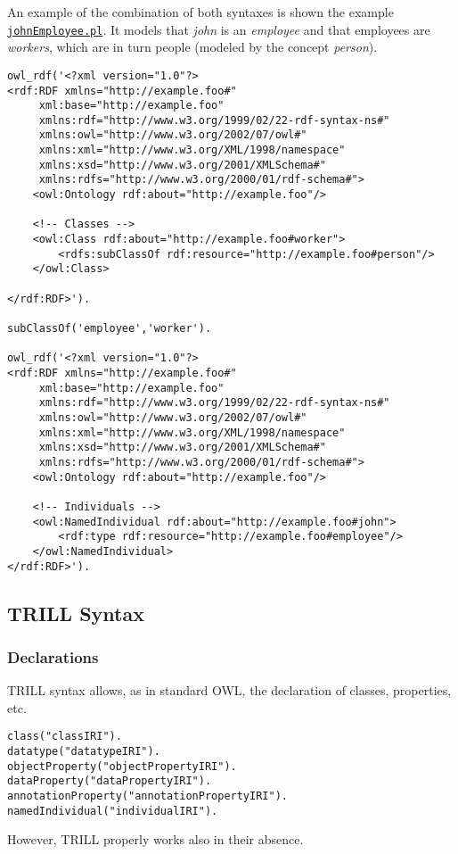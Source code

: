 An example of the combination of both syntaxes is shown the example \href{http://trill.lamping.unife.it/example/trill/johnEmployee.pl}{\texttt{johnEmployee.pl}}. It models that \textit{john} is an \textit{employee} and that employees are \textit{workers}, which are in turn people (modeled by the concept \textit{person}).
\begin{verbatim}
owl_rdf('<?xml version="1.0"?>
<rdf:RDF xmlns="http://example.foo#"
     xml:base="http://example.foo"
     xmlns:rdf="http://www.w3.org/1999/02/22-rdf-syntax-ns#"
     xmlns:owl="http://www.w3.org/2002/07/owl#"
     xmlns:xml="http://www.w3.org/XML/1998/namespace"
     xmlns:xsd="http://www.w3.org/2001/XMLSchema#"
     xmlns:rdfs="http://www.w3.org/2000/01/rdf-schema#">
    <owl:Ontology rdf:about="http://example.foo"/>

    <!-- Classes -->
    <owl:Class rdf:about="http://example.foo#worker">
        <rdfs:subClassOf rdf:resource="http://example.foo#person"/>
    </owl:Class>

</rdf:RDF>').

subClassOf('employee','worker').

owl_rdf('<?xml version="1.0"?>
<rdf:RDF xmlns="http://example.foo#"
     xml:base="http://example.foo"
     xmlns:rdf="http://www.w3.org/1999/02/22-rdf-syntax-ns#"
     xmlns:owl="http://www.w3.org/2002/07/owl#"
     xmlns:xml="http://www.w3.org/XML/1998/namespace"
     xmlns:xsd="http://www.w3.org/2001/XMLSchema#"
     xmlns:rdfs="http://www.w3.org/2000/01/rdf-schema#">
    <owl:Ontology rdf:about="http://example.foo"/>
    
    <!-- Individuals -->
    <owl:NamedIndividual rdf:about="http://example.foo#john">
        <rdf:type rdf:resource="http://example.foo#employee"/>
    </owl:NamedIndividual>
</rdf:RDF>').
\end{verbatim}

\subsection{TRILL Syntax}
\label{trill-syn}
\subsubsection{Declarations}


TRILL syntax allows, as in standard OWL, the declaration of classes, properties, etc.
\begin{verbatim}
class("classIRI").
datatype("datatypeIRI").
objectProperty("objectPropertyIRI").
dataProperty("dataPropertyIRI").
annotationProperty("annotationPropertyIRI").
namedIndividual("individualIRI").
\end{verbatim}
However, TRILL properly works also in their absence.

